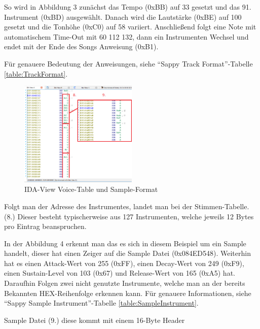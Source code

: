 \documentclass[11pt,a4paper]{scrartcl}
\begin{document}
So wird in Abbildung 3 zun\"{a}chst das Tempo (0xBB) auf 33 gesetzt und das 91. Instrument (0xBD) ausgew\"{a}hlt. Danach wird die Lautst\"{a}rke (0xBE) auf 100 gesetzt und die Tonh\"{o}he (0xC0) auf 58 variiert. Anschlie{\ss}end folgt eine Note mit automatischem Time-Out mit 60 112 132, dann ein Instrumenten Wechsel und endet mit der Ende des Songs Anweisung (0xB1). 

F\"{u}r genauere Bedeutung der Anweisungen, siehe "`Sappy Track Format"'-Tabelle \ref{table:TrackFormat}.

\newpage 

\begin{figure}
	\vspace{-10pt}
	\begin{center}
		\includegraphics[width=0.5\textwidth]{Sampleformat}
	\end{center}
	\vspace{-10pt}
	\caption{IDA-View Voice-Table und Sample-Format}
	\label{fig:Sampleformat}
	\vspace{-30pt}
\end{figure}

Folgt man der Adresse des Instrumentes, landet man bei der Stimmen-Tabelle. (8.) Dieser besteht typischerweise aus 127 Instrumenten, welche jeweils 12 Bytes pro Eintrag beanspruchen.

In der Abbildung 4 erkennt man das es sich in diesem Beispiel um ein Sample handelt, dieser hat einen Zeiger auf die Sample Datei (0x084ED548). Weiterhin hat es einen Attack-Wert von 255 (0xFF), einen Decay-Wert von 249 (0xF9), einen Sustain-Level von 103 (0x67) und Release-Wert von 165 (0xA5) hat. Daraufhin Folgen zwei nicht genutzte Instrumente, welche man an der bereits Bekannten HEX-Reihenfolge erkennen kann.
F\"{u}r genauere Informationen, siehe "`Sappy Sample Instrument"'-Tabelle \ref{table:SampleInstrument}.

Sample Datei (9.) diese kommt mit einem 16-Byte Header 
\end{document}
